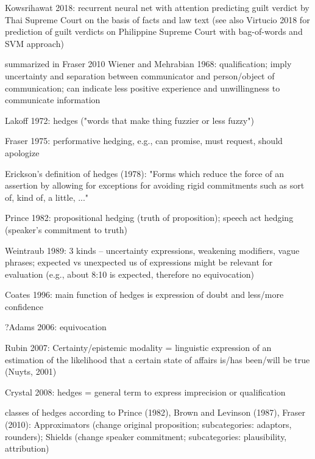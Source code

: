 \documentclass[11pt,a4paper]{article}
\begin{document}
Kowsrihawat 2018: recurrent neural net with attention predicting guilt verdict by Thai Supreme Court on the basis of facts and law text (see also Virtucio 2018 for prediction of guilt verdicts on Philippine Supreme Court with bag-of-words and SVM approach)


summarized in Fraser 2010
Wiener and Mehrabian 1968: qualification; imply uncertainty and separation between communicator and person/object of communication; can indicate less positive experience and unwillingness to communicate information

Lakoff 1972: hedges ("words that make thing fuzzier or less fuzzy")

Fraser 1975: performative hedging, e.g., can promise, must request, should apologize

Erickson's definition of hedges (1978): "Forms which reduce the force of an assertion by allowing for exceptions for avoiding rigid commitments such as sort of, kind of, a little, ..."

Prince 1982: propositional hedging (truth of proposition); speech act hedging (speaker's commitment to truth)

Weintraub 1989: 3 kinds -- uncertainty expressions, weakening modifiers, vague phrases; expected vs unexpected us of expressions might be relevant for evaluation (e.g., about 8:10 is expected, therefore no equivocation)

Coates 1996: main function of hedges is expression of doubt and less/more confidence

?Adams 2006: equivocation

Rubin 2007: Certainty/epistemic modality = linguistic expression of an estimation of the likelihood that a certain state of affairs is/has been/will be true (Nuyts, 2001)

Crystal 2008: hedges = general term to express imprecision or qualification

classes of hedges according to Prince (1982), Brown and Levinson (1987), Fraser (2010): Approximators (change original proposition; subcategories: adaptors, rounders); Shields (change speaker commitment; subcategories: plausibility, attribution)
\end{document}

